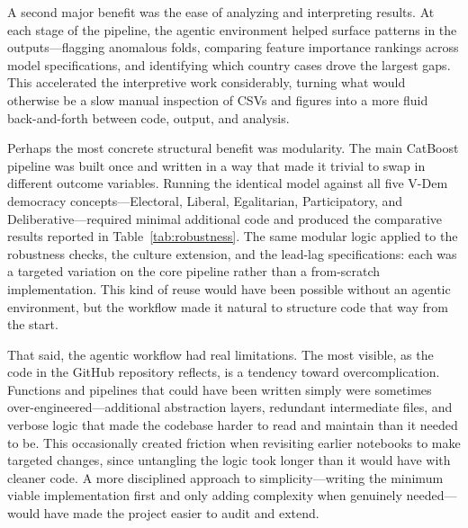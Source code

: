 \documentclass[9pt,twoside]{pnas-new}
\begin{document}
A second major benefit was the ease of analyzing and interpreting results. At each stage of the pipeline, the agentic environment helped surface patterns in the outputs---flagging anomalous folds, comparing feature importance rankings across model specifications, and identifying which country cases drove the largest gaps. This accelerated the interpretive work considerably, turning what would otherwise be a slow manual inspection of CSVs and figures into a more fluid back-and-forth between code, output, and analysis.

Perhaps the most concrete structural benefit was modularity. The main CatBoost pipeline was built once and written in a way that made it trivial to swap in different outcome variables. Running the identical model against all five V-Dem democracy concepts---Electoral, Liberal, Egalitarian, Participatory, and Deliberative---required minimal additional code and produced the comparative results reported in Table~\ref{tab:robustness}. The same modular logic applied to the robustness checks, the culture extension, and the lead-lag specifications: each was a targeted variation on the core pipeline rather than a from-scratch implementation. This kind of reuse would have been possible without an agentic environment, but the workflow made it natural to structure code that way from the start.

That said, the agentic workflow had real limitations. The most visible, as the code in the GitHub repository reflects, is a tendency toward overcomplication. Functions and pipelines that could have been written simply were sometimes over-engineered---additional abstraction layers, redundant intermediate files, and verbose logic that made the codebase harder to read and maintain than it needed to be. This occasionally created friction when revisiting earlier notebooks to make targeted changes, since untangling the logic took longer than it would have with cleaner code. A more disciplined approach to simplicity---writing the minimum viable implementation first and only adding complexity when genuinely needed---would have made the project easier to audit and extend.



\showacknow


\end{document}
